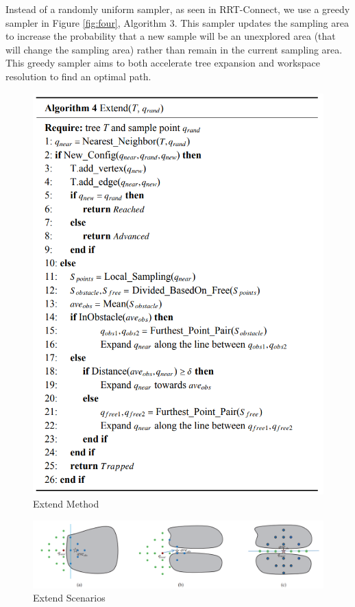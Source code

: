 \documentclass[conference]{IEEEtran}
\begin{document}
Instead of a randomly uniform sampler, as seen in RRT-Connect, we use a greedy sampler in Figure \ref{fig:four}, Algorithm 3. This sampler updates the sampling area to increase the probability that a new sample will be an unexplored area (that will change the sampling area) rather than remain in the current sampling area. This greedy sampler aims to both accelerate tree expansion and workspace resolution to find an optimal path.


\begin{figure}[!t]
  \centering
  \includegraphics[width=\linewidth]{algorithm4}  %
  \caption{Extend Method}
  \label{fig:two}
\end{figure}

\begin{figure}[!t]
  \centering
  \includegraphics[width=\linewidth]{extend-scenarios}  %
  \caption{Extend Scenarios}
  \label{fig:extend-scenarios}
\end{figure}
\end{document}
